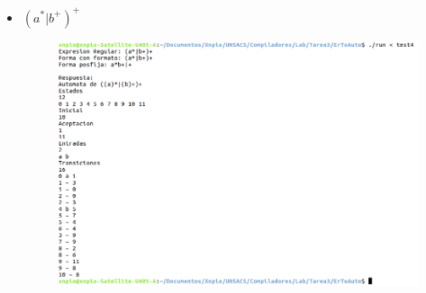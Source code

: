 \documentclass[a4paper,12pt]{article}
\begin{document}
\begin{itemize}
\begin{figure}[H]
 \end{figure}
 \item $(a^{*}|b^{+})^{+}$
 \begin{figure}[H]
  \centering
  \includegraphics[scale = 0.4]{4.png}
 \end{figure}



 
\end{itemize}
\end{document}
